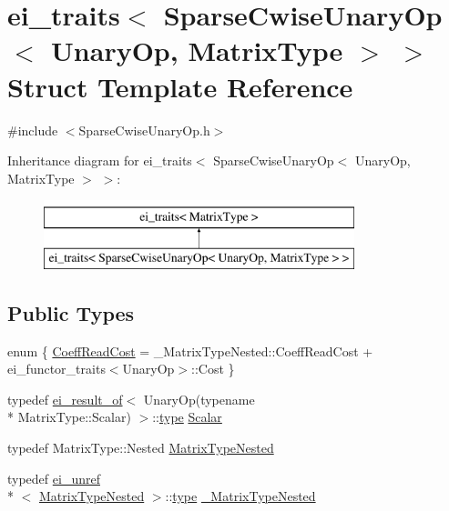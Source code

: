\hypertarget{structei__traits_3_01_sparse_cwise_unary_op_3_01_unary_op_00_01_matrix_type_01_4_01_4}{\section{ei\-\_\-traits$<$ Sparse\-Cwise\-Unary\-Op$<$ Unary\-Op, Matrix\-Type $>$ $>$ Struct Template Reference}
\label{structei__traits_3_01_sparse_cwise_unary_op_3_01_unary_op_00_01_matrix_type_01_4_01_4}
}


{\ttfamily \#include $<$Sparse\-Cwise\-Unary\-Op.\-h$>$}

Inheritance diagram for ei\-\_\-traits$<$ Sparse\-Cwise\-Unary\-Op$<$ Unary\-Op, Matrix\-Type $>$ $>$\-:\begin{figure}[H]
\begin{center}
\leavevmode
\includegraphics[height=2.000000cm]{structei__traits_3_01_sparse_cwise_unary_op_3_01_unary_op_00_01_matrix_type_01_4_01_4}
\end{center}
\end{figure}
\subsection*{Public Types}
\begin{DoxyCompactItemize}
\item 
enum \{ \hyperlink{structei__traits_3_01_sparse_cwise_unary_op_3_01_unary_op_00_01_matrix_type_01_4_01_4_a8919cb551eff0214dee068e4dd16b93da5974c6862e5314846fc62d71ae309c53}{Coeff\-Read\-Cost} = \-\_\-\-Matrix\-Type\-Nested\-:\-:Coeff\-Read\-Cost + ei\-\_\-functor\-\_\-traits$<$Unary\-Op$>$\-:\-:Cost
 \}
\item 
typedef \hyperlink{structei__result__of}{ei\-\_\-result\-\_\-of}$<$ Unary\-Op(typename \\*
Matrix\-Type\-::\-Scalar) $>$\-::\hyperlink{glext_8h_a7d05960f4f1c1b11f3177dc963a45d86}{type} \hyperlink{structei__traits_3_01_sparse_cwise_unary_op_3_01_unary_op_00_01_matrix_type_01_4_01_4_ad367b56d9d8e6da1261047e6c2152e63}{Scalar}
\item 
typedef Matrix\-Type\-::\-Nested \hyperlink{structei__traits_3_01_sparse_cwise_unary_op_3_01_unary_op_00_01_matrix_type_01_4_01_4_a7e6d89c823ad15cabb91e353ed6b4786}{Matrix\-Type\-Nested}
\item 
typedef \hyperlink{structei__unref}{ei\-\_\-unref}\\*
$<$ \hyperlink{structei__traits_3_01_sparse_cwise_unary_op_3_01_unary_op_00_01_matrix_type_01_4_01_4_a7e6d89c823ad15cabb91e353ed6b4786}{Matrix\-Type\-Nested} $>$\-::\hyperlink{glext_8h_a7d05960f4f1c1b11f3177dc963a45d86}{type} \hyperlink{structei__traits_3_01_sparse_cwise_unary_op_3_01_unary_op_00_01_matrix_type_01_4_01_4_a94c434bd45b95ce2a74affa79ec2c186}{\-\_\-\-Matrix\-Type\-Nested}
\end{DoxyCompactItemize}


